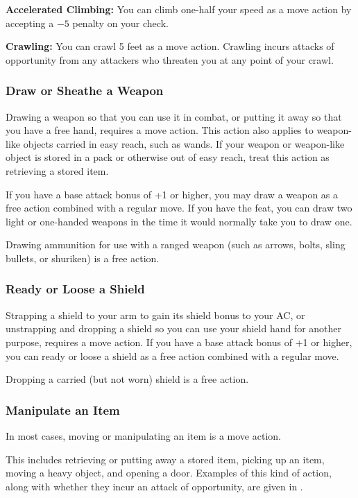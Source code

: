 \textbf{Accelerated Climbing:} You can climb one-half your speed as a move action by accepting a $-5$ penalty on your  check.

\textbf{Crawling:} You can crawl 5 feet as a move action. Crawling incurs attacks of opportunity from any attackers who threaten you at any point of your crawl.

\subsubsection{Draw or Sheathe a Weapon}
Drawing a weapon so that you can use it in combat, or putting it away so that you have a free hand, requires a move action. This action also applies to weapon-like objects carried in easy reach, such as wands. If your weapon or weapon-like object is stored in a pack or otherwise out of easy reach, treat this action as retrieving a stored item.

If you have a base attack bonus of +1 or higher, you may draw a weapon as a free action combined with a regular move. If you have the  feat, you can draw two light or one-handed weapons in the time it would normally take you to draw one.

Drawing ammunition for use with a ranged weapon (such as arrows, bolts, sling bullets, or shuriken) is a free action.

\subsubsection{Ready or Loose a Shield}
Strapping a shield to your arm to gain its shield bonus to your AC, or unstrapping and dropping a shield so you can use your shield hand for another purpose, requires a move action. If you have a base attack bonus of +1 or higher, you can ready or loose a shield as a free action combined with a regular move.

Dropping a carried (but not worn) shield is a free action.

\subsubsection{Manipulate an Item}
In most cases, moving or manipulating an item is a move action.

This includes retrieving or putting away a stored item, picking up an item, moving a heavy object, and opening a door. Examples of this kind of action, along with whether they incur an attack of opportunity, are given in .

